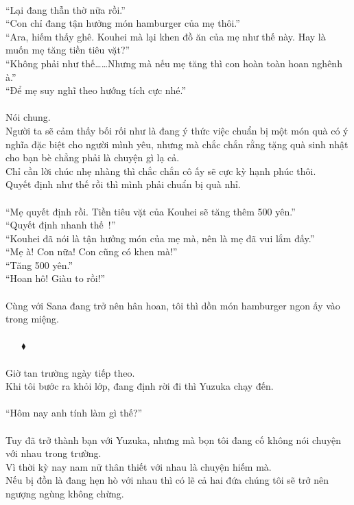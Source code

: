 \documentclass[12pt,a4paper, twosides]{book}
\begin{document}
\\
“Lại đang thẫn thờ nữa rồi.”\\
“Con chỉ đang tận hưởng món hamburger của mẹ thôi.”\\
“Ara, hiếm thấy ghê. Kouhei mà lại khen đồ ăn của mẹ như thế này. Hay là muốn mẹ tăng tiền tiêu vặt?”\\
“Không phải như thế……Nhưng mà nếu mẹ tăng thì con hoàn toàn hoan nghênh à.”\\
“Để mẹ suy nghĩ theo hướng tích cực nhé.”\\
\\
Nói chung.\\
Người ta sẽ cảm thấy bối rối như là đang ý thức việc chuẩn bị một món quà có ý nghĩa đặc biệt cho người mình yêu, nhưng mà chắc chắn rằng tặng quà sinh nhật cho bạn bè chẳng phải là chuyện gì lạ cả.\\
Chỉ cần lời chúc nhẹ nhàng thì chắc chắn cô ấy sẽ cực kỳ hạnh phúc thôi.\\
Quyết định như thế rồi thì mình phải chuẩn bị quà nhỉ.\\
\\
“Mẹ quyết định rồi. Tiền tiêu vặt của Kouhei sẽ tăng thêm 500 yên.”\\
“Quyết định nhanh thế~!”\\
“Kouhei đã nói là tận hưởng món của mẹ mà, nên là mẹ đã vui lắm đấy.”\\
“Mẹ à! Con nữa! Con cũng có khen mà!”\\
“Tăng 500 yên.”\\
“Hoan hô! Giàu to rồi!”\\
\\
Cùng với Sana đang trở nên hân hoan, tôi thì dồn món hamburger ngon ấy vào trong miệng.\\
\\
     $\mathbin{\blacklozenge}$\\
\\
Giờ tan trường ngày tiếp theo.\\
Khi tôi bước ra khỏi lớp, đang định rời đi thì Yuzuka chạy đến.\\
\\
“Hôm nay anh tính làm gì thế?”\\
\\
Tuy đã trở thành bạn với Yuzuka, nhưng mà bọn tôi đang cố không nói chuyện với nhau trong trường.\\
Vì thời kỳ nay nam nữ thân thiết với nhau là chuyện hiếm mà.\\
Nếu bị đồn là đang hẹn hò với nhau thì có lẽ cả hai đứa chúng tôi sẽ trở nên ngượng ngùng không chừng.\\
\end{document}

